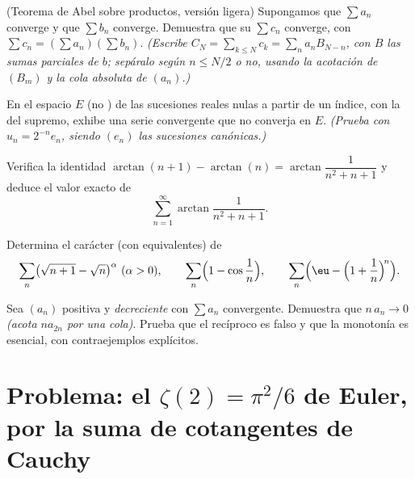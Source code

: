 \begin{exercise}[$\star\star\star$]\label{exo:b2:series:8}
(Teorema de Abel sobre productos, versión ligera) Supongamos que
$\sum a_n$ converge  y que $\sum b_n$ converge.
Demuestra que su  $\sum c_n$ converge, con $\sum
c_n = (\sum a_n)(\sum b_n)$. \emph{(Escribe $C_N = \sum_{k\leq N}
c_k = \sum_n a_n B_{N-n}$, con $B$ las sumas parciales de $b$;
sepáralo según $n \leq N/2$ o no, usando la acotación de $(B_m)$ y
la cola absoluta de $(a_n)$.)}
\end{exercise}

\begin{exercise}[$\star\star\star$]\label{exo:b2:series:9}
En el espacio $E$ (no ) de las sucesiones reales nulas a
partir de un índice, con la  del supremo, exhibe una serie
 convergente que no converja en $E$. \emph{(Prueba con
$u_n = 2^{-n} e_n$, siendo $(e_n)$ las sucesiones canónicas.)}
\end{exercise}

\begin{exercise}[$\star\star$]\label{exo:b2:series:10}
Verifica la identidad $\arctan(n+1) - \arctan(n) =
\arctan\dfrac{1}{n^2 + n + 1}$ y deduce el valor exacto de
\[
\sum_{n=1}^{\infty} \arctan\frac{1}{n^2 + n + 1} .
\]
\end{exercise}

\begin{exercise}[$\star\star$]\label{exo:b2:series:11}
Determina el carácter (con equivalentes) de
\[
\sum_n \bigl(\sqrt{n+1} - \sqrt n\bigr)^{\alpha}
\ (\alpha > 0), \qquad
\sum_n \Bigl(1 - \cos\frac1n\Bigr), \qquad
\sum_n \Bigl(\eu - \Bigl(1 + \frac1n\Bigr)^{\!n}\Bigr).
\]
\end{exercise}

\begin{exercise}[$\star\star\star$]\label{exo:b2:series:12}
Sea $(a_n)$ positiva y \emph{decreciente} con $\sum a_n$
convergente. Demuestra que $n\,a_n \to 0$ \emph{(acota $n a_{2n}$
por una cola)}. Prueba que el recíproco es falso y que la monotonía
es esencial, con contraejemplos explícitos.
\end{exercise}

\section{Problema: el $\zeta(2) = \pi^2/6$ de Euler, por la suma de
cotangentes de Cauchy}

